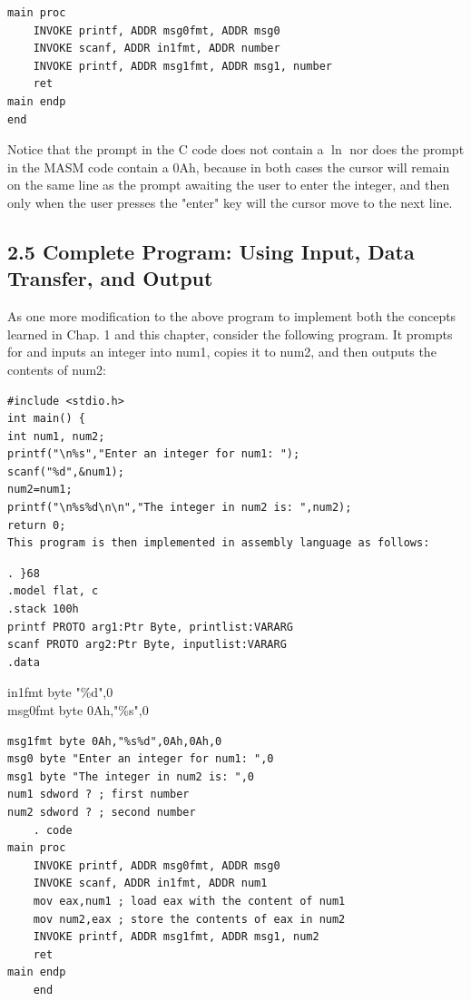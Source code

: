 \documentclass[10pt]{article}
\begin{document}
\begin{verbatim}
main proc
    INVOKE printf, ADDR msg0fmt, ADDR msg0
    INVOKE scanf, ADDR in1fmt, ADDR number
    INVOKE printf, ADDR msg1fmt, ADDR msg1, number
    ret
main endp
end
\end{verbatim}

Notice that the prompt in the C code does not contain a $\ln$ nor does the prompt in the MASM code contain a 0Ah, because in both cases the cursor will remain on the same line as the prompt awaiting the user to enter the integer, and then only when the user presses the "enter" key will the cursor move to the next line.

\subsection*{2.5 Complete Program: Using Input, Data Transfer, and Output}
As one more modification to the above program to implement both the concepts learned in Chap. 1 and this chapter, consider the following program. It prompts for and inputs an integer into num1, copies it to num2, and then outputs the contents of num2:

\begin{verbatim}
#include <stdio.h>
int main() {
int num1, num2;
printf("\n%s","Enter an integer for num1: ");
scanf("%d",&num1);
num2=num1;
printf("\n%s%d\n\n","The integer in num2 is: ",num2);
return 0;
This program is then implemented in assembly language as follows:
\end{verbatim}

\begin{verbatim}
. }68
.model flat, c
.stack 100h
printf PROTO arg1:Ptr Byte, printlist:VARARG
scanf PROTO arg2:Ptr Byte, inputlist:VARARG
.data
\end{verbatim}

in1fmt byte "\%d",0\\
msg0fmt byte 0Ah,"\%s",0

\begin{verbatim}
msg1fmt byte 0Ah,"%s%d",0Ah,0Ah,0
msg0 byte "Enter an integer for num1: ",0
msg1 byte "The integer in num2 is: ",0
num1 sdword ? ; first number
num2 sdword ? ; second number
    . code
main proc
    INVOKE printf, ADDR msg0fmt, ADDR msg0
    INVOKE scanf, ADDR in1fmt, ADDR num1
    mov eax,num1 ; load eax with the content of num1
    mov num2,eax ; store the contents of eax in num2
    INVOKE printf, ADDR msg1fmt, ADDR msg1, num2
    ret
main endp
    end
\end{verbatim}
\end{document}
